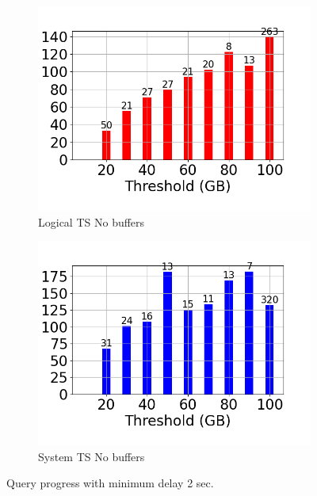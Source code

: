\begin{figure}
	\begin{subfigure}[c]{0.48\textwidth}
		\includegraphics[width=1\textwidth]   {figures/Experiments/Dynamic/Progress/2/average_query_time_per_batch_version_999777016_10485760_10_delay[2].png}
		\caption{Logical TS No buffers}
		\label{fig:progress-queries-2-logical-no-buffers}
	\end{subfigure}
	\begin{subfigure}[c]{0.48\textwidth}
		\includegraphics[width=1\textwidth]   {figures/Experiments/Dynamic/Progress/2/average_query_time_per_batch_version_999777017_10485760_10_delay[2].png}
		\caption{System TS No buffers}
		\label{fig:progress-queries-2-system-no-buffers}
	\end{subfigure}
	\caption{Query progress with minimum delay 2 sec.}
	\label{fig:query-progress-delay-2}
\end{figure}

